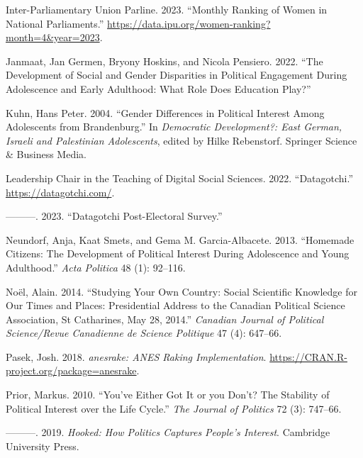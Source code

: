 \documentclass[
  letterpaper,
  DIV=11,
  numbers=noendperiod]{scrreprt}
\newlength{\cslhangindent}
\newlength{\cslentryspacingunit} %
\newenvironment{CSLReferences}[2] %
 {%
  \setlength{\parindent}{0pt}
  \ifodd #1
  \let\oldpar\par
  \def\par{\hangindent=\cslhangindent\oldpar}
  \fi
  \setlength{\parskip}{#2\cslentryspacingunit}
 }%
 {}
\begin{document}
\begin{CSLReferences}{1}{0}
\leavevmode{}%
Inter-Parliamentary Union Parline. 2023. {``{Monthly Ranking of Women in
National Parliaments}.''}
\url{https://data.ipu.org/women-ranking?month=4\&year=2023}.

\leavevmode{}%
Janmaat, Jan Germen, Bryony Hoskins, and Nicola Pensiero. 2022. {``{The
Development of Social and Gender Disparities in Political Engagement
During Adolescence and Early Adulthood: What Role Does Education
Play?}''}

\leavevmode{}%
Kuhn, Hans Peter. 2004. {``{Gender Differences in Political Interest
Among Adolescents from Brandenburg}.''} In \emph{{Democratic
Development?: East German, Israeli and Palestinian Adolescents}}, edited
by Hilke Rebenstorf. Springer Science \& Business Media.

\leavevmode{}%
Leadership Chair in the Teaching of Digital Social Sciences. 2022.
{``{Datagotchi}.''} \url{https://datagotchi.com/}.

\leavevmode{}%
---------. 2023. {``{Datagotchi Post-Electoral Survey}.''}

\leavevmode{}%
Neundorf, Anja, Kaat Smets, and Gema M. Garcia-Albacete. 2013.
{``{Homemade Citizens: The Development of Political Interest During
Adolescence and Young Adulthood}.''} \emph{Acta Politica} 48 (1):
92--116.

\leavevmode{}%
Noël, Alain. 2014. {``{Studying Your Own Country: Social Scientific
Knowledge for Our Times and Places: Presidential Address to the Canadian
Political Science Association, St Catharines, May 28, 2014}.''}
\emph{Canadian Journal of Political Science/Revue Canadienne de Science
Politique} 47 (4): 647--66.

\leavevmode{}%
Pasek, Josh. 2018. \emph{{anesrake: ANES Raking Implementation}}.
\url{https://CRAN.R-project.org/package=anesrake}.

\leavevmode{}%
Prior, Markus. 2010. {``{You've Either Got It or you Don't? The
Stability of Political Interest over the Life Cycle}.''} \emph{The
Journal of Politics} 72 (3): 747--66.

\leavevmode{}%
---------. 2019. \emph{{Hooked: How Politics Captures People's
Interest}}. Cambridge University Press.


\end{CSLReferences}
\end{document}
